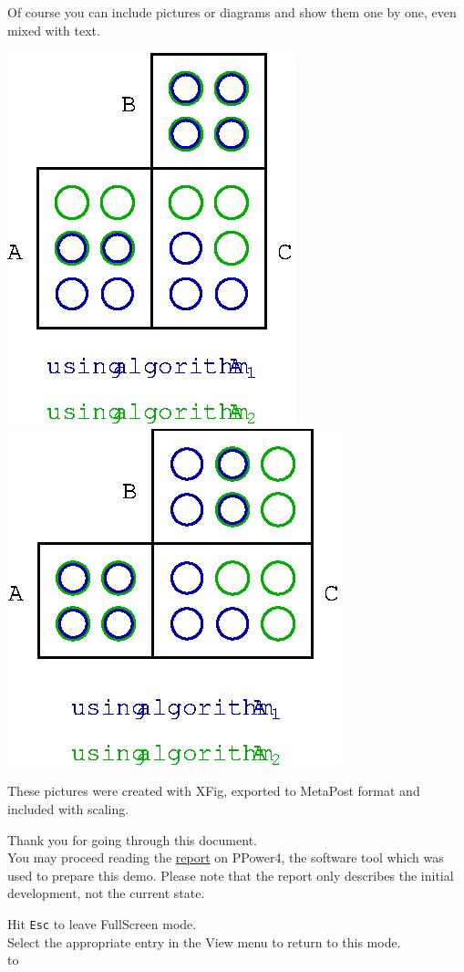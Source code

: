 \documentclass[30pt,landscape]{foils}
\begin{document}
Of course you can include pictures or diagrams and show them one by one\pause,
even mixed with text.
  \begin{center}
  \includegraphics[scale=1.6]{matrixb1e}
  \pause\qquad\qquad
  \includegraphics[scale=1.6]{matrixb2e}
  \end{center}
{\small These pictures were created with XFig, exported to MetaPost format
  and included with scaling.}


Thank you for going through this document.\\
You may proceed reading the
\href{http://www-sp.iti.informatik.tu-darmstadt.de/software/ppower4/report.pdf}%
{report} on PPower4, the software tool which was used to prepare this demo.
Please note that the report only describes the initial development,
not the current state.
\hypertarget{Ende}{}
\vfill

Hit \texttt{Esc} to leave FullScreen mode.\\
Select the appropriate entry in the View menu to return to this mode.\\
\hbox to 
\end{document}
